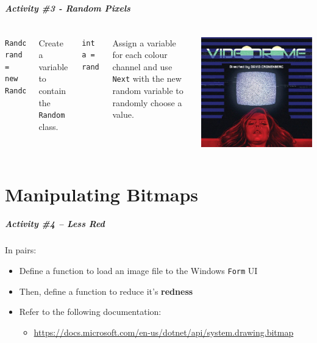 \begin{frame}[fragile]
	\frametitle{Activity \#3 - Random Pixels}
\begin{columns}
	\begin{lstlisting}
Random rand = new Random();
	\end{lstlisting}
Create a variable to contain the \texttt{Random} class.
	\begin{lstlisting}
int a = rand.Next(256);
	\end{lstlisting}
Assign a variable for each colour channel and use \texttt{Next} with the new random variable to randomly choose a value.

\includegraphics[scale=0.14]{videodrome}
\end{columns}
\end{frame}

\part{Manipulating Bitmaps}
\frame{\partpage}

\begin{frame}
	\frametitle{Activity \#4 -- Less Red}
	
	In pairs:
	
	\vspace{2em}
	
	\begin{itemize}		
		\item Define a function to load an image file to the Windows \texttt{Form} UI
		\item Then, define a function to reduce it's \textbf{redness}
		\item Refer to the following documentation:
		\begin{itemize}
			\item \url{https://docs.microsoft.com/en-us/dotnet/api/system.drawing.bitmap}
		\end{itemize}
	\end{itemize}
\end{frame}

